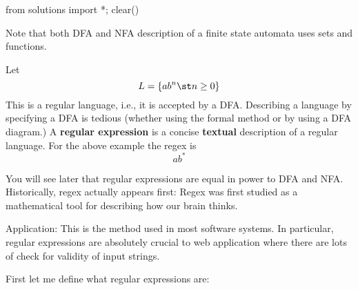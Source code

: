 \begin{python0}
from solutions import *; clear()
\end{python0}

\begin{comment}
\textbf{Objectives}
\begin{tightlist}
\item Verify if an expression is an regular expression
\item Describe informal the language generated by a regex
\item Given an informal description of a regular language,
  write down the corresponding regex
\item Translate between a regex and a state diagram
\item Translate between a regex and a DFA
\item Translate between a regex and an NFA
\end{tightlist}
\mbox{}
\end{comment}

Note that both DFA and NFA description of a finite state automata
uses sets and functions.

Let
\[
L = \{ a b^n \st n \geq 0 \}
\]
This is a regular language, i.e., it is accepted by a DFA.
Describing a language by specifying a DFA is tedious
(whether using the formal method or by using a DFA diagram.)
A \textbf{regular expression} is a concise \textbf{textual} description
of a regular language. For the above example the regex is
\[
ab^*
\]

You will see later that regular expressions are equal in power to
DFA and NFA. 
Historically, regex actually appears first: 
Regex was first studied as a mathematical tool for describing
how our brain thinks.

Application: This is the method used in most software
systems. In particular, regular expressions are absolutely crucial
to web application where there are lots of check for validity of
input strings.

First let me define what regular expressions are:

